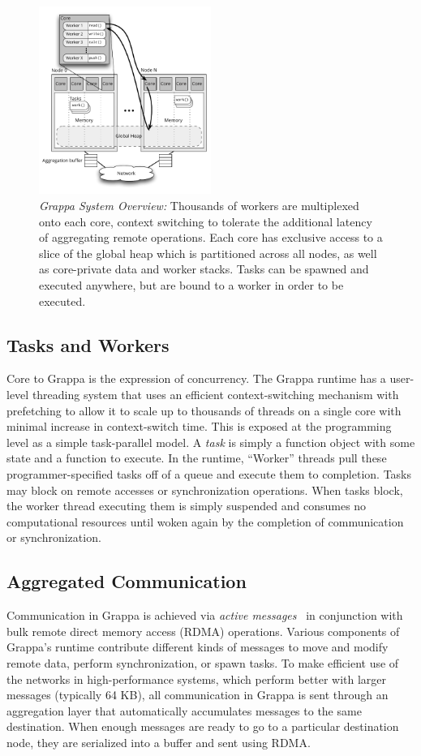 \begin{figure}[t]
  \centering
  \includegraphics[width=0.5\textwidth]{figs/grappa_system.pdf}
  \caption{\emph{Grappa System Overview:}
    Thousands of workers are multiplexed onto each core, context switching to tolerate the additional latency of aggregating remote operations. Each core has exclusive access to a slice of the global heap which is partitioned across all nodes, as well as core-private data and worker stacks. Tasks can be spawned and executed anywhere, but are bound to a worker in order to be executed.
  }
  \label{fig:system}
\end{figure}

\subsection{Tasks and Workers}
Core to Grappa is the expression of concurrency. The Grappa runtime has a user-level threading system that uses an efficient context-switching mechanism with prefetching to allow it to scale up to thousands of threads on a single core with minimal increase in context-switch time. This is exposed at the programming level as a simple task-parallel model. A \emph{task} is simply a function object with some state and a function to execute. In the runtime, ``Worker'' threads pull these programmer-specified tasks off of a queue and execute them to completion. Tasks may block on remote accesses or synchronization operations. When tasks block, the worker thread executing them is simply suspended and consumes no computational resources until woken again by the completion of communication or synchronization.

\subsection{Aggregated Communication}
Communication in Grappa is achieved via \emph{active messages}~\cite{vonEicken92} in conjunction with bulk remote direct memory access (RDMA) operations. Various components of Grappa's runtime contribute different kinds of messages to move and modify remote data, perform synchronization, or spawn tasks. To make efficient use of the networks in high-performance systems, which perform better with larger messages (typically 64 KB), all communication in Grappa is sent through an aggregation layer that automatically accumulates messages to the same destination. When enough messages are ready to go to a particular destination node, they are serialized into a buffer and sent using RDMA.

